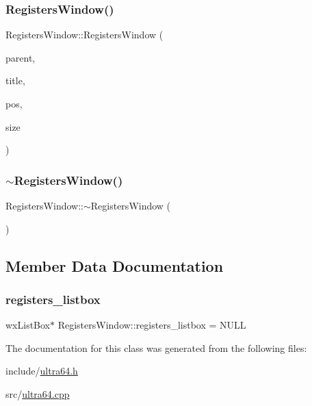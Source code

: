 \subsubsection{\texorpdfstring{Registers\+Window()}{RegistersWindow()}}
{\footnotesize\ttfamily Registers\+Window\+::\+Registers\+Window (\begin{DoxyParamCaption}\item[{wx\+Window $\ast$}]{parent,  }\item[{const wx\+String \&}]{title,  }\item[{const wx\+Point \&}]{pos,  }\item[{const wx\+Size \&}]{size }\end{DoxyParamCaption})}

\mbox{\label{class_registers_window_a8218bf9cb1730e750c4c9ce8c6b92cfb}} 
\subsubsection{\texorpdfstring{$\sim$\+Registers\+Window()}{~RegistersWindow()}}
{\footnotesize\ttfamily Registers\+Window\+::$\sim$\+Registers\+Window (\begin{DoxyParamCaption}{ }\end{DoxyParamCaption})}



\subsection{Member Data Documentation}
\mbox{\label{class_registers_window_a5d8baf6bde30c9782d102ed64816a3b3}} 
\subsubsection{\texorpdfstring{registers\+\_\+listbox}{registers\_listbox}}
{\footnotesize\ttfamily wx\+List\+Box$\ast$ Registers\+Window\+::registers\+\_\+listbox = N\+U\+LL}



The documentation for this class was generated from the following files\+:\begin{DoxyCompactItemize}
\item 
include/\hyperlink{ultra64_8h}{ultra64.\+h}\item 
src/\hyperlink{ultra64_8cpp}{ultra64.\+cpp}\end{DoxyCompactItemize}
